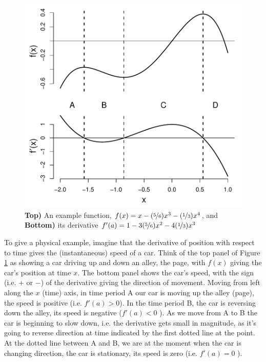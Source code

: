 \begin{figure}
 \begin{center}
   \includegraphics[width=0.7 \textwidth]{math_background/calc_pics/Derivat.pdf}\end{center}
 \caption{{\bf Top)} An example function, $f(x) = x -(\nicefrac{5}{6})x^3  -
   (\nicefrac{1}{3}) x^4$, and {\bf Bottom)} its derivative $f'(a) = 1 - 3(\nicefrac{5}{6}) x^2 -4 (\nicefrac{1}{3}) x^3$
   }\label{Fig:derivative}
\end{figure}
To give a physical example, imagine that the derivative of position with respect to
time gives the (instantaneous) speed of a car. Think of the top panel of Figure \ref{Fig:derivative}
as showing a car driving up and down an
alley, the page, with $f(x)$ giving the car's position at time $x$. The bottom panel
shows the car's speed, with the sign (i.e. $+$ or $-$) of the derivative giving the direction of
movement. Moving from left along the $x$ (time) axis, in time period A our car is moving up the alley (page), the speed is
positive (i.e. $f'(a)>0$). In the time period B, the car is reversing down the alley, its speed is negative ($f'(a)<0$ ).  
As we move from A to B the car is beginning to slow down, i.e. the derivative gets small
in magnitude, as it's going to reverse direction at time indicated by
the first dotted line at the point. At the
dotted line between A and B, we are at the moment when the car is changing direction, the car is
stationary, its speed is zero (i.e. $f'(a)=0$ ). 

